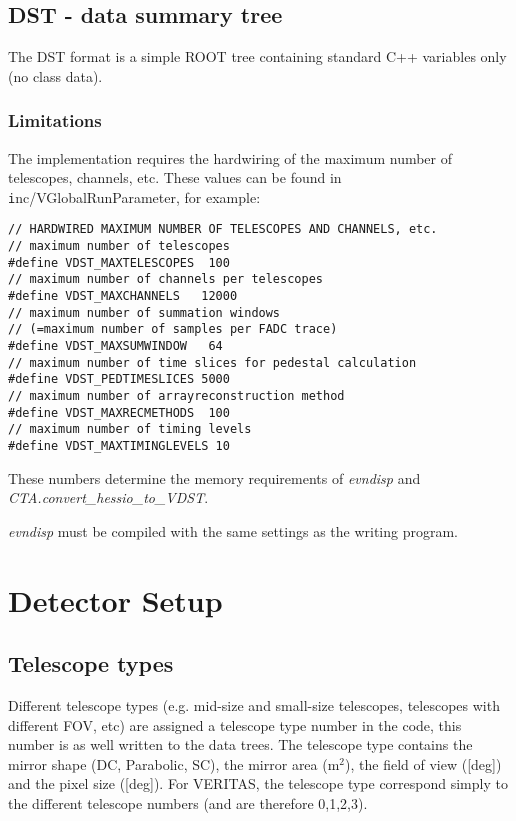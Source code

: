 \documentclass[titlepage,a4paper,twoside,11pt]{report}
\begin{document}
\section{DST - data summary tree}
\label{SECTION.DST}

The DST format is a simple ROOT tree containing standard C++ variables only (no class data).

\subsection{Limitations}
\label{SUBSECTION.DST.LIMITATIONS}

The implementation requires the hardwiring of the maximum number of telescopes, channels, etc. 
These values can be found in {\texttt inc/VGlobalRunParameter}, for example:

\begin{lstlisting}
// HARDWIRED MAXIMUM NUMBER OF TELESCOPES AND CHANNELS, etc.
// maximum number of telescopes
#define VDST_MAXTELESCOPES  100
// maximum number of channels per telescopes
#define VDST_MAXCHANNELS   12000
// maximum number of summation windows
// (=maximum number of samples per FADC trace)   
#define VDST_MAXSUMWINDOW   64
// maximum number of time slices for pedestal calculation
#define VDST_PEDTIMESLICES 5000   
// maximum number of arrayreconstruction method 
#define VDST_MAXRECMETHODS  100
// maximum number of timing levels
#define VDST_MAXTIMINGLEVELS 10    
\end{lstlisting}

 These numbers determine the memory requirements of {\it evndisp} and {\it CTA.convert\_hessio\_to\_VDST}.

 {\it evndisp} must be compiled with the same settings as the writing program.


\chapter{Detector Setup}


\section{Telescope types}

Different telescope types (e.g. mid-size and small-size telescopes, telescopes with different FOV, etc) are assigned a telescope type number in the code, this number is as well written to the data trees. The telescope type  contains the mirror shape (DC, Parabolic, SC), the mirror area (m$^2$), the field of view ([deg]) and the pixel size ([deg]). For VERITAS, the telescope type correspond simply to the different telescope numbers (and are therefore 0,1,2,3).
\end{document}
